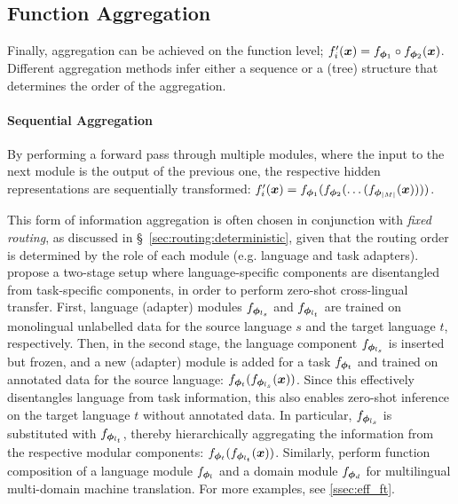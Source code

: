 \documentclass[10pt]{article} %
\begin{document}
\subsection{Function Aggregation}
\label{sec:compositionality:function}

Finally, aggregation can be achieved on the function level; $f_i^\prime({\bm{x}}) = f_{{\bm{\phi}}_{1}} \circ f_{{\bm{\phi}}_{2}}({\bm{x}})$. Different aggregation methods infer either a sequence or a (tree) structure that determines the order of the aggregation.

\paragraph*{Sequential Aggregation}

By performing a forward pass through multiple modules, where the input to the next module is the output of the previous one, the respective hidden representations are sequentially transformed: 
$f_i^\prime({\bm{x}}) = f_{{\bm{\phi}}_1} ( f_{{\bm{\phi}}_2} (\dots (f_{{\bm{\phi}}_{|M|}}({\bm{x}}))))$.

This form of information aggregation is often chosen in conjunction with \textit{fixed routing}, as discussed in \S~\ref{sec:routing:deterministic}, given that the routing order is determined by the role of each module (e.g. language and task adapters).
\citet{pfeiffer-etal-2020-mad, Pfeiffer2021UNKs} propose a two-stage setup where language-specific components are disentangled from task-specific components, in order to perform zero-shot cross-lingual transfer. First, language (adapter) modules $f_{{\bm{\phi}}_{l_s}}$ and $f_{{\bm{\phi}}_{l_t}}$ are trained on monolingual unlabelled data for the source language $s$ and the target language $t$, respectively. Then, in the second stage, the language component $f_{{\bm{\phi}}_{l_s}}$ is inserted but frozen, and a new (adapter) module is added for a task $f_{{\bm{\phi}}_{t}}$ and trained on annotated data for the source language: $f_{{\bm{\phi}}_{t}} (f_{{\bm{\phi}}_{l_s}}({\bm{x}}))$.
Since this effectively disentangles language from task information, this also enables zero-shot inference on the target language $t$ without annotated data. In particular, $f_{{\bm{\phi}}_{l_s}}$ is substituted with $f_{{\bm{\phi}}_{l_t}}$, thereby hierarchically aggregating the information from the respective modular components: $f_{{\bm{\phi}}_{t}} (f_{{\bm{\phi}}_{l_t}}({\bm{x}}))$.
Similarly, \citet{Stickland2021MultilingualDomainAdapt} perform function composition of a language module $f_{{\bm{\phi}}_{l}}$ and a domain module $f_{{\bm{\phi}}_{d}}$ for multilingual multi-domain machine translation. For more examples, see \cref{ssec:eff_ft}. 
\end{document}

